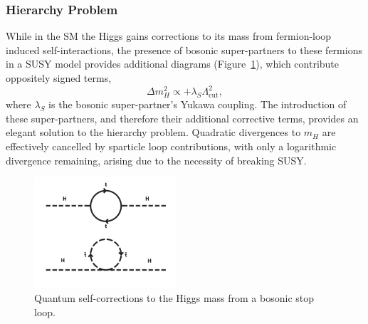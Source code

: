 \subsubsection{Hierarchy Problem}
While in the SM the Higgs gains corrections to its mass from fermion-loop
induced self-interactions, the presence of bosonic super-partners to these
fermions in a SUSY model provides additional diagrams (Figure~\ref{fig:quantum_higgs_sboson_loop}),
which contribute oppositely signed terms,
% 
\begin{equation}
\Delta m_H^2 \propto + \lambda_S \Lambda_{\text{cut}}^2 ,
\end{equation}
% 
where $\lambda_S$ is the bosonic super-partner's Yukawa coupling. The introduction
of these super-partners, and therefore their additional corrective terms,
provides an elegant solution to the hierarchy problem. Quadratic
divergences to $m_H$ are effectively cancelled by sparticle loop contributions, with
only a logarithmic divergence remaining, arising due to the necessity of breaking
SUSY.

\begin{figure}[ht!]
\centering
\includegraphics[width=0.47\textwidth,trim=0 0 0 250, clip=true]
{Figs/feynman/600px-Hqmc-vector.png}
\caption{Quantum self-corrections to the Higgs mass from a bosonic stop
loop.}
\label{fig:quantum_higgs_sboson_loop}
\end{figure}

